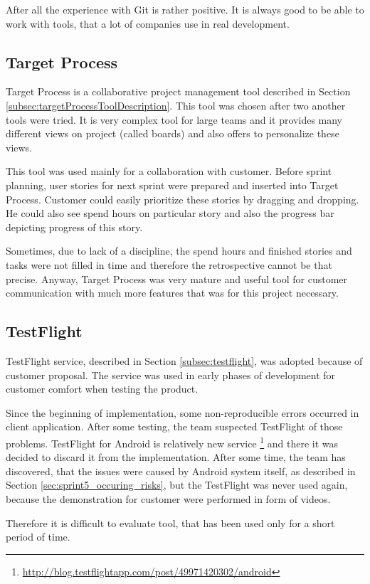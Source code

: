 After all the experience with Git is rather positive. 
It is always good to be able to work with tools, that a lot of companies use in real development.


\subsection{Target Process}
Target Process is a collaborative project management tool described in Section \ref{subsec:targetProcessToolDescription}.
This tool was chosen after two another tools were tried.
It is very complex tool for large teams and it provides many different views on project (called boards) and also offers to personalize these views.

This tool was used mainly for a collaboration with customer. 
Before sprint planning, user stories for next sprint were prepared and inserted into Target Process.
Customer could easily prioritize these stories by dragging and dropping.
He could also see spend hours on particular story and also the progress bar depicting progress of this story.

Sometimes, due to lack of a discipline, the spend hours and finished stories and tasks were not filled in time and therefore the retrospective cannot be that precise.
Anyway, Target Process was very mature and useful tool for customer communication with much more features that was for this project necessary.


\subsection{TestFlight}
TestFlight service, described in Section \ref{subsec:testflight}, was adopted because of customer proposal.
The service was used in early phases of development for customer comfort when testing the product.

Since the beginning of implementation, some non-reproducible errors occurred in client application.
After some testing, the team suspected TestFlight of those problems.
TestFlight for Android is relatively new service \footnote{\url{http://blog.testflightapp.com/post/49971420302/android}} and there it was decided to discard it from the implementation.
After some time, the team has discovered, that the issues were caused by Android system itself, as described in Section \ref{sec:sprint5_occuring_risks}, but the TestFlight was never used again, because the demonstration for customer were performed in form of videos.
 
Therefore it is difficult to evaluate tool, that has been used only for a short period of time.

